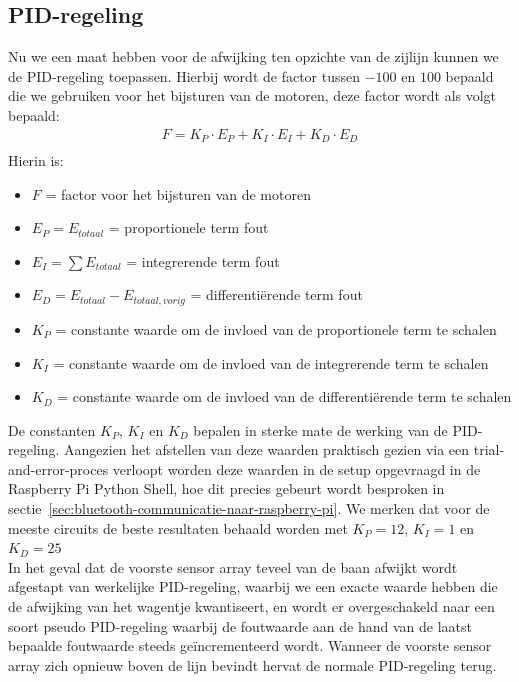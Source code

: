 \subsection{PID-regeling}
Nu we een maat hebben voor de afwijking ten opzichte van de zijlijn kunnen we de PID-regeling toepassen. Hierbij wordt de factor tussen $-100$ en $100$ bepaald die we gebruiken voor het bijsturen van de motoren, deze factor wordt als volgt bepaald:
\begin{gather*}
	F = K_P \cdot E_P + K_I \cdot E_I + K_D \cdot E_D\\
\end{gather*}
Hierin is:
\begin{itemize}
	\item $F$ = factor voor het bijsturen van de motoren
	\item $E_P = E_{totaal}$ = proportionele term fout
	\item $E_I = \sum E_{totaal}$ = integrerende term fout
	\item $E_D = E_{totaal} - E_{totaal,vorig}$ = differenti\"erende term fout
	\item $K_P$ = constante waarde om de invloed van de proportionele term te schalen
	\item $K_I$ = constante waarde om de invloed van de integrerende term te schalen
	\item $K_D$ = constante waarde om de invloed van de differenti\"erende term te schalen
\end{itemize}
De constanten $K_P$, $K_I$ en $K_D$ bepalen in sterke mate de werking van de PID-regeling. Aangezien het afstellen van deze waarden praktisch gezien via een trial-and-error-proces verloopt worden deze waarden in de setup opgevraagd in de Raspberry Pi Python Shell, hoe dit precies gebeurt wordt besproken in sectie~\vref{sec:bluetooth-communicatie-naar-raspberry-pi}. We merken dat voor de meeste circuits de beste resultaten behaald worden met $K_P=12$, $K_I=1$ en $K_D=25$\\

In het geval dat de voorste sensor array teveel van de baan afwijkt wordt afgestapt van werkelijke PID-regeling, waarbij we een exacte waarde hebben die de afwijking van het wagentje kwantiseert, en wordt er overgeschakeld naar een soort pseudo PID-regeling waarbij de foutwaarde aan de hand van de laatst bepaalde foutwaarde steeds ge\"incrementeerd wordt. Wanneer de voorste sensor array zich opnieuw boven de lijn bevindt hervat de normale PID-regeling terug.


